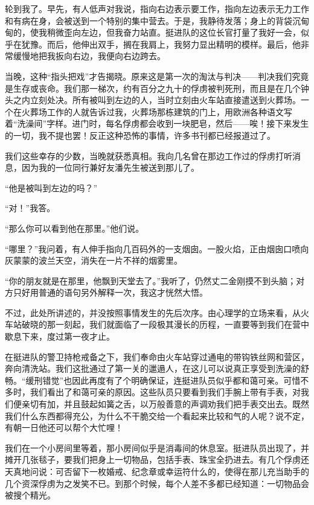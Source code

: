 \documentclass[11pt,oneside]{book}
\begin{document}
\begin{common-format}
轮到我了。早先，有人低声对我说，指向右边表示要工作，指向左边表示无力工作和有病在身，会被送到一个特别的集中营去。于是，我静待发落；身上的背袋沉甸甸的，使我稍微歪向左边，但我奋力站直。挺进队的这位长官打量了我好一会，似乎在犹豫。而后，他伸出双手，搁在我肩上，我努力显出精明的模样。最后，他非常缓慢地把我扳向右边，我便向右边跨去。

当晚，这种“指头把戏”才告揭晓。原来这是第一次的淘汰与判决——判决我们究竟是生存或丧命。我们那一梯次，约有百分之九十的俘虏被判死刑，而且是在几个钟头之内立刻处决。所有被叫到左边的人，当时立刻由火车站直接遣送到火葬场。一个在火葬场工作的人就告诉过我，火葬场那栋建筑的门上，用欧洲各种语文写着“洗澡间”字样。进门时，每名俘虏都会收到一块肥皂，然后——唉！接下来发生的一切，我不提也罢！反正这种恐怖的事情，许多书刊都已经报道过了。

我们这些幸存的少数，当晚就获悉真相。我向几名曾在那边工作过的俘虏打听消息，因为我的一位同行兼好友潘先生被送到那儿了。

“他是被叫到左边的吗？”

“对！”我答。

“那么你可以看到他在那里。”他们说。

“哪里？”我问着，有人伸手指向几百码外的一支烟囱。一股火焰，正由烟囱口喷向灰蒙蒙的波兰天空，消失在一片不祥的烟雾里。

“你的朋友就是在那里，他飘到天堂去了。”我听了，仍然丈二金刚摸不到头脑；对方只好用普通的语句另外解释一次，我这才恍然大悟。

不过，此处所讲述的，并没按照事情发生的先后次序。由心理学的立场来看，从火车站破晓的那一刻起，我们就面临了一段极其漫长的历程，一直要等到我们在营中歇息下来，度过第一夜才止。

在挺进队的警卫持枪戒备之下，我们奉命由火车站穿过通电的带钩铁丝网和营区，奔向清洗站。我们这批通过了第一关的邋遢人，在这儿可以说真正享受到洗澡的舒畅。“缓刑错觉”也因此再度有了个明确保证，连挺进队员似乎都和蔼可亲。可惜不多时，我们看出了和蔼可亲的原因。这些队员只要看到我们手腕上带有手表，对我们便亲切有加，并且鼓起如簧之舌，以万般善意的声调劝我们把手表交出去。既然我们什么东西都得充公，为什么不干脆交给一个看起来比较和气的人呢？说不定，有朝一日他还可以帮个大忙哩！

我们在一个小房间里等着，那小房间似乎是消毒间的休息室。挺进队员出现了，并摊开几张毯子，要我们把身上一切物品，包括手表、珠宝全扔进去。有几个俘虏还天真地问说：可否留下一枚婚戒、纪念章或幸运符什么的，使得在那儿充当助手的几个资深俘虏为之发笑不已。到那个时候，每个人差不多都已经知道：一切物品会被搜个精光。


\end{common-format}
\end{document}
